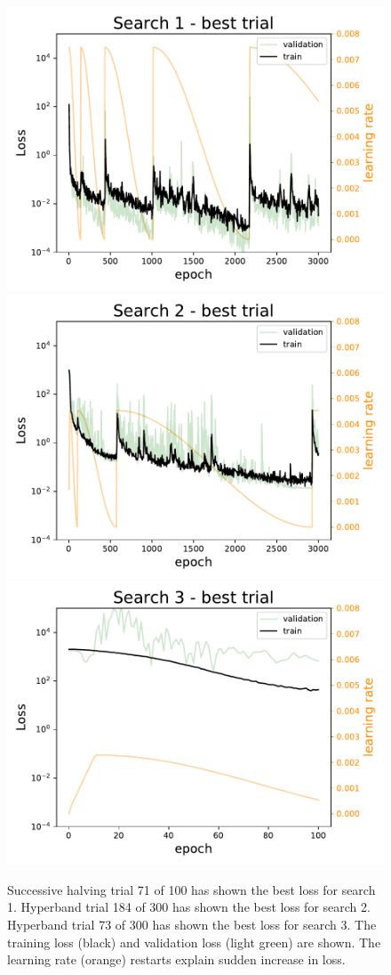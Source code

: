 \begin{figure}
    \centering
    \includegraphics[width=0.33\linewidth]{skinstression/images/hyperparameter-search/search-1/best-trial-loss.pdf}
    \includegraphics[width=0.33\linewidth]{skinstression/images/hyperparameter-search/search-2/best-trial-loss.pdf}
    \includegraphics[width=0.33\linewidth]{skinstression/images/hyperparameter-search/search-3/best-trial-loss.pdf}
    \caption[Hyperparameter search best losses]{
        Successive halving trial 71 of 100 has shown the best loss for search 1.
        Hyperband trial 184 of 300 has shown the best loss for search 2.
        Hyperband trial 73 of 300 has shown the best loss for search 3.
        The training loss (black) and validation loss (light green) are shown.
        The learning rate (orange) restarts explain sudden increase in loss.
    }
    \label{fig:skinstression-search-best-loss}
\end{figure}



